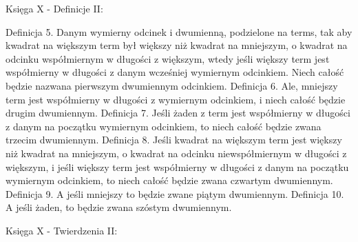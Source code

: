     
    Księga X - Definicje II:
    
    Definicja 5.
        Danym wymierny odcinek i dwumienną, podzielone na terms, tak aby kwadrat na większym term był większy niż kwadrat na mniejszym, o kwadrat na odcinku współmiernym w długości z większym, wtedy jeśli większy term jest współmierny w długości z danym wcześniej wymiernym odcinkiem. Niech całość będzie nazwana pierwszym dwumiennym odcinkiem.
    Definicja 6.
        Ale, mniejszy term jest współmierny w długości z wymiernym odcinkiem, i niech całość będzie drugim dwumiennym.
    Definicja 7.
        Jeśli żaden z term jest współmierny w długości z danym na początku wymiernym odcinkiem, to niech całość będzie zwana trzecim dwumiennym.
    Definicja 8.
        Jeśli kwadrat na większym term jest większy niż kwadrat na mniejszym, o kwadrat na odcinku niewspółmiernym w długości z większym, i jeśli większy term jest współmierny w długości z danym na początku wymiernym odcinkiem, to niech całość będzie zwana czwartym dwumiennym.
    Definicja 9.
        A jeśli mniejszy to będzie zwane piątym dwumiennym.
    Definicja 10.
        A jeśli żaden, to będzie zwana szóstym dwumiennym.
    
    
    Księga X - Twierdzenia II:
    
